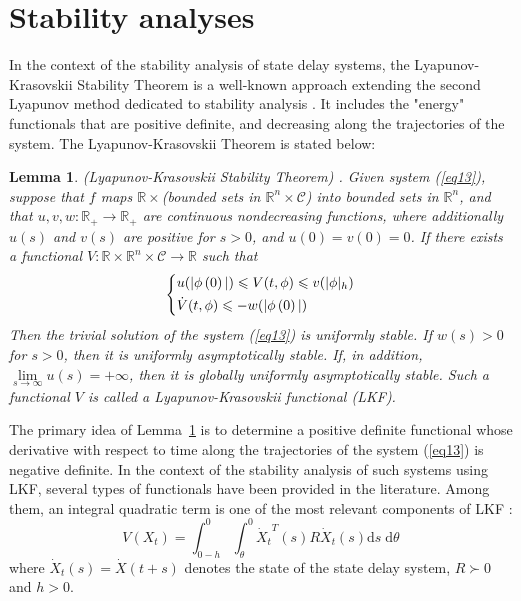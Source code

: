 \documentclass[a4paper]{cas-sc}
\newtheorem{lemma}[theorem]{Lemma}
\begin{document}
\section{Stability analyses}
\label{Section 4}

In the context of the stability analysis of state delay systems, the Lyapunov-Krasovskii Stability Theorem is a well-known approach extending the second Lyapunov method dedicated to stability analysis \citep{Gu2003}. It includes the "energy" functionals that are positive definite, and decreasing along the trajectories of the system. The Lyapunov-Krasovskii Theorem is stated below:
\begin{lemma}
  \label{lemma3}
  (Lyapunov-Krasovskii Stability Theorem) \citep{Gu2009}. Given system (\ref{eq13}), suppose that $f$ maps $\mathbb{R} \times  $(bounded sets in ${\mathbb{R}^n} \times \mathcal{C} $) into bounded sets in ${\mathbb{R}^n} $, and that $u,v,w:{\mathbb{R}_ + } \to {\mathbb{R}_ + } $ are continuous nondecreasing functions, where additionally $u(s) $ and $v(s) $ are positive for $s > 0 $, and $u(0) = v(0) = 0 $. If there exists a functional $V:\mathbb{R} \times {\mathbb{R}^n} \times \mathcal{C} \to \mathbb{R} $ such that
  \begin{equation}
    \left\{ \begin{gathered}
      u(|\phi \left( 0 \right)|) \leqslant V(t,\phi ) \leqslant v(|\phi {|_h}) \hfill \\
      \dot V(t,\phi ) \leqslant  - w(|\phi \left( 0 \right)|) \hfill \\
    \end{gathered}  \right.
    \label{eq15}
  \end{equation}
  Then the trivial solution of the system (\ref{eq13}) is uniformly stable. If $w(s) > 0 $ for $s > 0 $, then it is uniformly asymptotically stable. If, in addition, $\mathop {\lim }\limits_{s \to \infty } u(s) =  + \infty  $, then it is globally uniformly asymptotically stable. Such a functional $V $ is called a Lyapunov-Krasovskii functional (LKF).
\end{lemma}

The primary idea of Lemma~\ref{lemma3} is to determine a positive definite functional whose derivative with respect to time along the trajectories of the system (\ref{eq13}) is negative definite. In the context of the stability analysis of such systems using LKF, several types of functionals have been provided in the literature. Among them, an integral quadratic term is one of the most relevant components of LKF \citep{pepe_lyapunovkrasovskii_2006}:
\begin{equation}
  V\left( {{X_t}} \right) = \int_{0 - h}^0 {\int_\theta ^0 {{{\dot X}_t}^T(s)R{{\dot X}_t}(s){\text{d}}s\;{\text{d}}\theta } }
  \label{eq16}
\end{equation}
where $ {\dot X_t}(s) = {\dot X}(t + s) $ denotes the state of the state delay system, $ R \succ 0 $ and $ h > 0 $.
\end{document}
